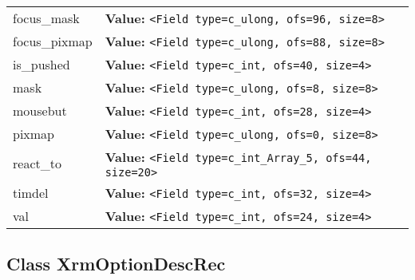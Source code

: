 \begin{longtable}{|p{\varnamewidth}|p{\vardescrwidth}|l}
\cline{1-2}
\raggedright f\-o\-c\-u\-s\-\_\-m\-a\-s\-k\- & \raggedright \textbf{Value:} 
{\tt {\textless}Field type=c\_ulong, ofs=96, size=8{\textgreater}}&\\
\cline{1-2}
\raggedright f\-o\-c\-u\-s\-\_\-p\-i\-x\-m\-a\-p\- & \raggedright \textbf{Value:} 
{\tt {\textless}Field type=c\_ulong, ofs=88, size=8{\textgreater}}&\\
\cline{1-2}
\raggedright i\-s\-\_\-p\-u\-s\-h\-e\-d\- & \raggedright \textbf{Value:} 
{\tt {\textless}Field type=c\_int, ofs=40, size=4{\textgreater}}&\\
\cline{1-2}
\raggedright m\-a\-s\-k\- & \raggedright \textbf{Value:} 
{\tt {\textless}Field type=c\_ulong, ofs=8, size=8{\textgreater}}&\\
\cline{1-2}
\raggedright m\-o\-u\-s\-e\-b\-u\-t\- & \raggedright \textbf{Value:} 
{\tt {\textless}Field type=c\_int, ofs=28, size=4{\textgreater}}&\\
\cline{1-2}
\raggedright p\-i\-x\-m\-a\-p\- & \raggedright \textbf{Value:} 
{\tt {\textless}Field type=c\_ulong, ofs=0, size=8{\textgreater}}&\\
\cline{1-2}
\raggedright r\-e\-a\-c\-t\-\_\-t\-o\- & \raggedright \textbf{Value:} 
{\tt {\textless}Field type=c\_int\_Array\_5, ofs=44, size=20{\textgreater}}&\\
\cline{1-2}
\raggedright t\-i\-m\-d\-e\-l\- & \raggedright \textbf{Value:} 
{\tt {\textless}Field type=c\_int, ofs=32, size=4{\textgreater}}&\\
\cline{1-2}
\raggedright v\-a\-l\- & \raggedright \textbf{Value:} 
{\tt {\textless}Field type=c\_int, ofs=24, size=4{\textgreater}}&\\
\cline{1-2}
\end{longtable}



\subsection{Class XrmOptionDescRec}

